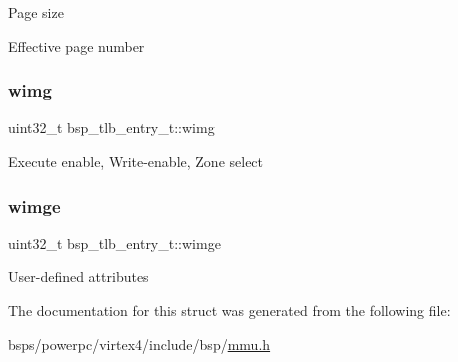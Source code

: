 Page size

Effective page number \mbox{\label{structbsp__tlb__entry__t_a2c0a0e41283a1a068722a6b8458ec6db}} 
\subsubsection{\texorpdfstring{wimg}{wimg}}
{\footnotesize\ttfamily uint32\+\_\+t bsp\+\_\+tlb\+\_\+entry\+\_\+t\+::wimg}

Execute enable, Write-\/enable, Zone select \mbox{\label{structbsp__tlb__entry__t_aa5f05607c9c1e2e1c761f719e30db36c}} 
\subsubsection{\texorpdfstring{wimge}{wimge}}
{\footnotesize\ttfamily uint32\+\_\+t bsp\+\_\+tlb\+\_\+entry\+\_\+t\+::wimge}

User-\/defined attributes 

The documentation for this struct was generated from the following file\+:\begin{DoxyCompactItemize}
\item 
bsps/powerpc/virtex4/include/bsp/\mbox{\hyperlink{powerpc_2virtex4_2include_2bsp_2mmu_8h}{mmu.\+h}}\end{DoxyCompactItemize}
